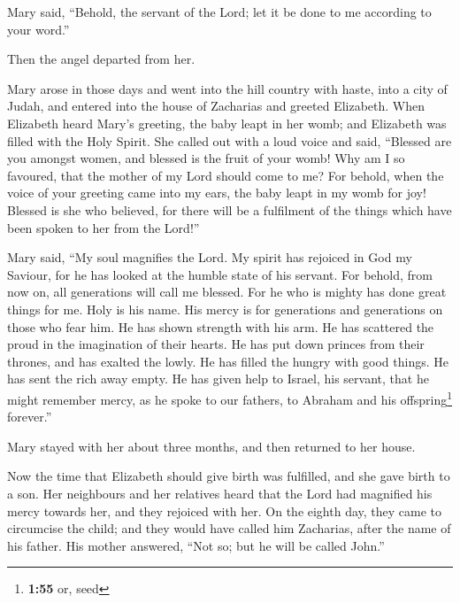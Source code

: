  Mary said, ``Behold, the servant of the Lord; let it be
done to me according to your word.''

Then the angel departed from her.

 Mary arose in those days and went into the hill country
with haste, into a city of Judah,  and entered into the
house of Zacharias and greeted Elizabeth.  When Elizabeth
heard Mary's greeting, the baby leapt in her womb; and Elizabeth was
filled with the Holy Spirit.  She called out with a loud
voice and said, ``Blessed are you amongst women, and blessed is the
fruit of your womb!  Why am I so favoured, that the
mother of my Lord should come to me?  For behold, when
the voice of your greeting came into my ears, the baby leapt in my womb
for joy!  Blessed is she who believed, for there will be
a fulfilment of the things which have been spoken to her from the
Lord!''

 Mary said, ``My soul magnifies the Lord. 
My spirit has rejoiced in God my Saviour,  for he has
looked at the humble state of his servant. For behold, from now on, all
generations will call me blessed.  For he who is mighty
has done great things for me. Holy is his name.  His
mercy is for generations and generations on those who fear him.
 He has shown strength with his arm. He has scattered the
proud in the imagination of their hearts.  He has put
down princes from their thrones, and has exalted the lowly.
 He has filled the hungry with good things. He has sent
the rich away empty.  He has given help to Israel, his
servant, that he might remember mercy,  as he spoke to
our fathers, to Abraham and his offspring\footnote{\textbf{1:55} or,
  seed} forever.''

 Mary stayed with her about three months, and then
returned to her house.

 Now the time that Elizabeth should give birth was
fulfilled, and she gave birth to a son.  Her neighbours
and her relatives heard that the Lord had magnified his mercy towards
her, and they rejoiced with her.  On the eighth day, they
came to circumcise the child; and they would have called him Zacharias,
after the name of his father.  His mother answered, ``Not
so; but he will be called John.''

